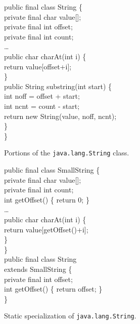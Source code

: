 \documentclass[preprint]{acmconf}
\begin{document}
\begin{figure}
\begin{samplecode}
public final class String \{\\
\>private final char value[];\\
\>private final int offset;\\
\>private final int count;\\
\>\ldots\\
\>public char charAt(int i) \{\\
\>\>return value[offset+i];\\
\>\}\\
\>public String substring(int start) \{\\
\>\>int noff = offset + start;\\
\>\>int ncnt = count - start;\\
\>\>return new String(value, noff, ncnt);\\
\>\}\\
\}\\
\end{samplecode}
\caption{Portions of the {\tt java.lang.String} class.}
\label{fig:string-fields}
\end{figure}

\begin{figure}
\begin{samplecode}
public final class SmallString \{\\
\>private final char value[];\\
\>private final int count;\\
\>int getOffset() \{ return 0; \}\\
\>\ldots\\
\>public char charAt(int i) \{\\
\>\>return value[getOffset()+i];\\
\>\}\\
\}\\
public final class String\\
\>\>extends SmallString \{\\
\>private final int offset;\\
\>int getOffset() \{ return offset; \}\\
\}\\
\end{samplecode}
\caption{Static specialization of {\tt java.lang.String}.}
\label{fig:big-small}
\end{figure}
\end{document}
